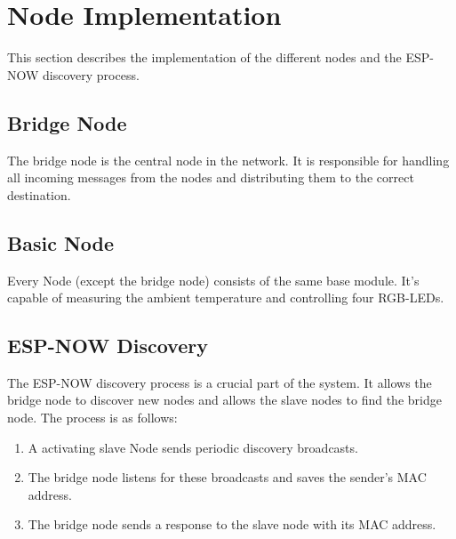 \section{Node Implementation} \label{sec:node_implemtenation}
This section describes the implementation of the different nodes and the ESP-NOW
discovery process.
    \subsection{Bridge Node} 
    The bridge node is the central node in the network. It is responsible for
    handling all incoming messages from the nodes and distributing them to the
    correct destination.


    \subsection{Basic Node}
    Every Node (except the bridge node) consists of the same base module. It's
    capable of measuring the ambient temperature and controlling four RGB-LEDs.


    \subsection{ESP-NOW Discovery}
    The ESP-NOW discovery process is a crucial part of the system. It allows the
    bridge node to discover new nodes and allows the slave nodes to find the bridge
    node. The process is as follows:
    \begin{enumerate}
        \item A activating slave Node sends periodic discovery broadcasts.
        \item The bridge node listens for these broadcasts and saves the
        sender's MAC address.
        \item The bridge node sends a response to the slave node with its 
        MAC address.
         
    \end{enumerate}